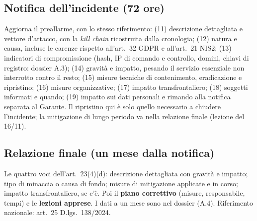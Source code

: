 \subsection{Notifica dell'incidente (72 ore)}
Aggiorna il preallarme, con lo stesso riferimento: (11) descrizione dettagliata e vettore d'attacco,
con la \emph{kill chain} ricostruita dalla cronologia; (12) natura e causa, incluse le carenze rispetto
all'art.~32 GDPR e all'art.~21 NIS2; (13) indicatori di compromissione (hash, IP di comando e
controllo, domini, chiavi di registro: dossier A.3); (14) gravità e impatto, pesando il servizio
essenziale non interrotto contro il resto; (15) misure tecniche di contenimento, eradicazione e
ripristino; (16) misure organizzative; (17) impatto transfrontaliero; (18) soggetti informati e quando;
(19) impatto sui dati personali e rimando alla notifica separata al Garante. Il ripristino qui è solo
quello necessario a chiudere l'incidente; la mitigazione di lungo periodo va nella relazione finale
(lezione del 16/11).

\subsection{Relazione finale (un mese dalla notifica)}
Le quattro voci dell'art.~23(4)(d): descrizione dettagliata con gravità e impatto; tipo di minaccia o
causa di fondo; misure di mitigazione applicate e in corso; impatto transfrontaliero, se c'è. Poi il
\textbf{piano correttivo} (misure, responsabile, tempi) e le \textbf{lezioni apprese}. I dati a un mese
sono nel dossier (A.4). Riferimento nazionale: art.~25 D.lgs.~138/2024.

